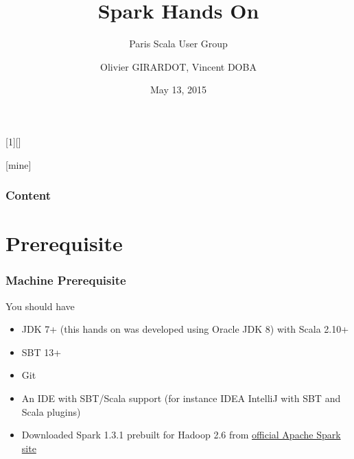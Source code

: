 \documentclass[slidetop,9pt,utf8]{beamer}
\begin{document}
\begin{CJK}{UTF8}{gbsn}

\AtBeginSection{\frame{\sectionpage}}

[1][]{%
}

[mine]

\title[Spark Hands On (PSUG)]{Spark Hands On}
\subtitle{Paris Scala User Group}
\author{Olivier GIRARDOT, Vincent DOBA}
\date{May 13, 2015}

\frame{\titlepage}

\begin{frame}[allowframebreaks]
  \frametitle{Content}
  \tableofcontents[hideallsubsections]
\end{frame}

\section{Prerequisite}

\begin{frame}
  \frametitle{Machine Prerequisite}

  \begin{block}{You should have}
    \begin{itemize}
      \item JDK 7+ (this hands on was developed using Oracle JDK 8) with Scala 2.10+
      \item SBT 13+
      \item Git
      \item An IDE with SBT/Scala support (for instance IDEA IntelliJ with SBT and Scala plugins)
      \item Downloaded Spark 1.3.1 prebuilt for Hadoop 2.6 from \href{http://www.apache.org/dyn/closer.cgi/spark/spark-1.3.1/spark-1.3.1-bin-hadoop2.6.tgz}{official Apache Spark site}
    \end{itemize}
  \end{block}


\end{frame}
\end{CJK}
\end{document}
